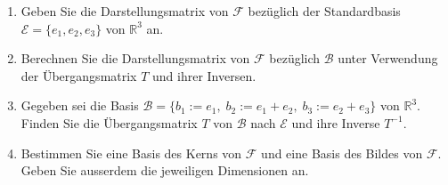 \begin{enumerate}[label=\alph*)]
    \item Geben Sie die Darstellungsmatrix von \( \mathcal{F} \) bezüglich der Standardbasis \( \mathcal{E} = \{e_1,e_2,e_3\} \) von \( \mathbb{R}^3 \) an.
    \item Berechnen Sie die Darstellungsmatrix von $\mathcal{F}$ bezüglich $\mathcal{B}$ unter Verwendung der Übergangsmatrix $T$ und ihrer Inversen.
    \item Gegeben sei die Basis \( \mathcal{B} = \{b_1 := e_1,\; b_2 :=e_1+e_2,\; b_3 := e_2+e_3 \} \) von \( \mathbb{R}^3 \). Finden Sie die Übergangsmatrix \( T \) von \( \mathcal{B} \) nach \( \mathcal{E} \) und ihre Inverse \( T^{-1} \).
    \item Bestimmen Sie eine Basis des Kerns von \( \mathcal{F} \) und eine Basis des Bildes von \( \mathcal{F} \). Geben Sie ausserdem die jeweiligen Dimensionen an.
\end{enumerate}

\vspace{1\baselineskip}

